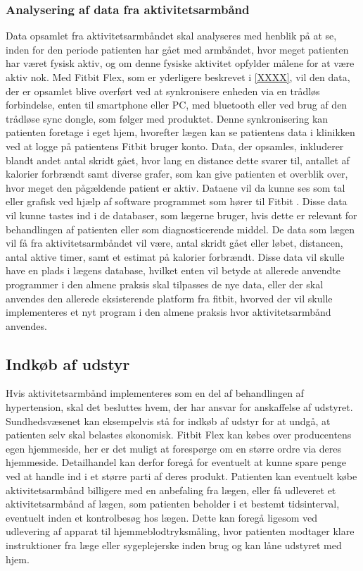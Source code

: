 \subsubsection{Analysering af data fra aktivitetsarmbånd}  
Data opsamlet fra aktivitetsarmbåndet skal analyseres med henblik på at se, inden for den periode patienten har gået med armbåndet, hvor meget patienten har været fysisk aktiv, og om denne fysiske aktivitet opfylder målene for at være aktiv nok.  
Med Fitbit Flex, som er yderligere beskrevet i \autoref{XXXX}, vil den data, der er opsamlet blive overført ved at synkronisere enheden via en trådløs forbindelse, enten til smartphone eller PC, med bluetooth eller ved brug af den trådløse sync dongle, som følger med produktet. Denne synkronisering kan patienten foretage i eget hjem, hvorefter lægen kan se patientens data i klinikken ved at logge på patientens Fitbit bruger konto. Data, der opsamles, inkluderer blandt andet antal skridt gået, hvor lang en distance dette svarer til, antallet af kalorier forbrændt samt diverse grafer, som kan give patienten et overblik over, hvor meget den pågældende patient er aktiv. Dataene vil da kunne ses som tal eller grafisk ved hjælp af software programmet som hører til Fitbit \citep{fitbitflex}. Disse data vil kunne tastes ind i de databaser, som lægerne bruger, hvis dette er relevant for behandlingen af patienten eller som diagnosticerende middel. De data som lægen vil få fra aktivitetsarmbåndet vil være, antal skridt gået eller løbet, distancen, antal aktive timer, samt et estimat på kalorier forbrændt. Disse data vil skulle have en plads i lægens database, hvilket enten vil betyde at allerede anvendte programmer i den almene praksis skal tilpasses de nye data, eller der skal anvendes den allerede eksisterende platform fra fitbit, hvorved der vil skulle implementeres et nyt program i den almene praksis hvor aktivitetsarmbånd anvendes. 

\subsection{Indkøb af udstyr}	
Hvis aktivitetsarmbånd implementeres som en del af behandlingen af hypertension, skal det besluttes hvem, der har ansvar for anskaffelse af udstyret. Sundhedsvæsenet kan eksempelvis stå for indkøb af udstyr for at undgå, at patienten selv skal belastes økonomisk. 
Fitbit Flex kan købes over producentens egen hjemmeside, her er det muligt at forespørge om en større ordre via deres hjemmeside. Detailhandel kan derfor foregå for eventuelt at kunne spare penge ved at handle ind i et større parti af deres produkt.
Patienten kan eventuelt købe aktivitetsarmbånd billigere med en anbefaling fra lægen, eller få udleveret et aktivitetsarmbånd af lægen, som patienten beholder i et bestemt tidsinterval, eventuelt inden et kontrolbesøg hos lægen. Dette kan foregå ligesom ved udlevering af apparat til hjemmeblodtryksmåling, hvor patienten modtager klare instruktioner fra læge eller sygeplejerske inden brug og kan låne udstyret med hjem.

